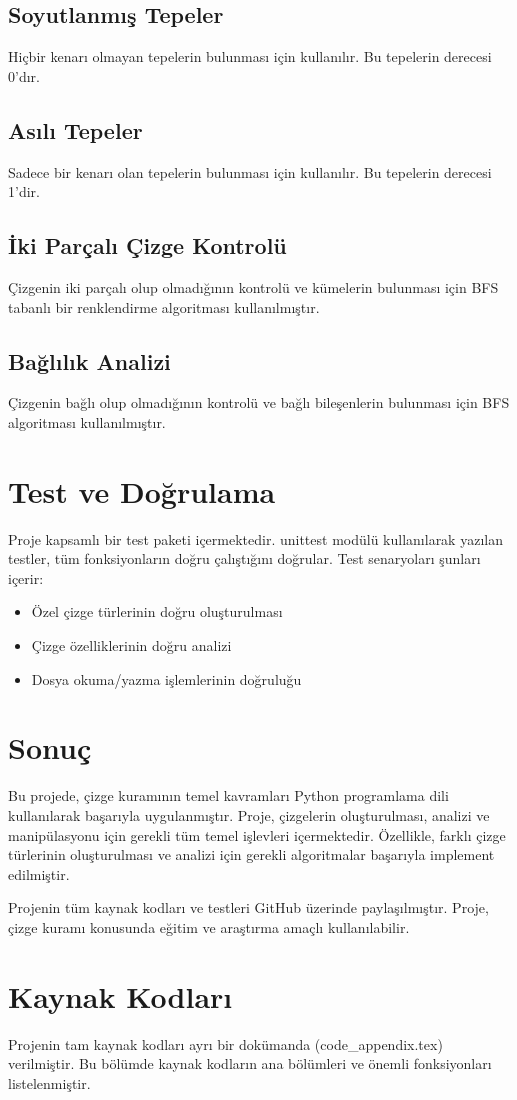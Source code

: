 \documentclass[12pt]{article}
\begin{document}
\subsection{Soyutlanmış Tepeler}
Hiçbir kenarı olmayan tepelerin bulunması için kullanılır. Bu tepelerin derecesi 0'dır.

\subsection{Asılı Tepeler}
Sadece bir kenarı olan tepelerin bulunması için kullanılır. Bu tepelerin derecesi 1'dir.

\subsection{İki Parçalı Çizge Kontrolü}
Çizgenin iki parçalı olup olmadığının kontrolü ve kümelerin bulunması için BFS tabanlı bir renklendirme algoritması kullanılmıştır.

\subsection{Bağlılık Analizi}
Çizgenin bağlı olup olmadığının kontrolü ve bağlı bileşenlerin bulunması için BFS algoritması kullanılmıştır.

\section{Test ve Doğrulama}
Proje kapsamlı bir test paketi içermektedir. unittest modülü kullanılarak yazılan testler, tüm fonksiyonların doğru çalıştığını doğrular. Test senaryoları şunları içerir:
\begin{itemize}
    \item Özel çizge türlerinin doğru oluşturulması
    \item Çizge özelliklerinin doğru analizi
    \item Dosya okuma/yazma işlemlerinin doğruluğu
\end{itemize}

\section{Sonuç}
Bu projede, çizge kuramının temel kavramları Python programlama dili kullanılarak başarıyla uygulanmıştır. Proje, çizgelerin oluşturulması, analizi ve manipülasyonu için gerekli tüm temel işlevleri içermektedir. Özellikle, farklı çizge türlerinin oluşturulması ve analizi için gerekli algoritmalar başarıyla implement edilmiştir.

Projenin tüm kaynak kodları ve testleri GitHub üzerinde paylaşılmıştır. Proje, çizge kuramı konusunda eğitim ve araştırma amaçlı kullanılabilir.

\appendix
\section{Kaynak Kodları}
Projenin tam kaynak kodları ayrı bir dokümanda (code\_appendix.tex) verilmiştir. Bu bölümde kaynak kodların ana bölümleri ve önemli fonksiyonları listelenmiştir.
\end{document}
